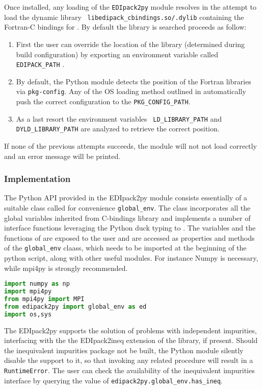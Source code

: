 \documentclass[edipack2.tex]{subfiles}
\begin{document}
Once installed, any loading of the {\tt EDIpack2py} module resolves in the
attempt to load the dynamic library {\tt
  libedipack\_cbindings.so/.dylib} containing the Fortran-C bindings
for \NAME. By default the library is searched proceeds as follow: 
\begin{enumerate}
\item First the user can override the location of the library
  (determined during \NAME build configuration) by exporting an
  environment variable called {\tt EDIPACK\_PATH} .
\item By default, the Python module detects the position of the
  Fortran libraries via {\tt pkg-config}. Any of the OS loading method
  outlined in  automatically push the
  correct configuration to the {\tt PKG\_CONFIG\_PATH}. 
\item As a last resort the environment variables {\tt
    LD\_LIBRARY\_PATH} and {\tt DYLD\_LIBRARY\_PATH} are analyzed to
  retrieve the correct position. 
\end{enumerate}
If none of the previous attempts succeeds, the module will not not load correctly and an error message will be printed. 



\subsubsection{Implementation}\label{sSecInteropEDIpyImplementation}
The Python API provided in the EDIpack2py module consists essentially of a
suitable class called for convenience {\tt global\_env}.
The class incorporates all the global variables inherited from \NAME
C-bindings library and implements a number of interface functions
leveraging the Python duck typing to \NAME.  
The variables and the functions of \NAME are exposed to the user and
are accessed as properties and
methods of the {\tt global\_env} claass, which needs to be imported at the beginning
of the python script, along with other useful modules. For instance Numpy is
necessary, while mpi4py is strongly recommended.

\begin{lstlisting}[language=python,  frame=lines]
import numpy as np
import mpi4py
from mpi4py import MPI
from edipack2py import global_env as ed
import os,sys
\end{lstlisting}

The EDIpack2py supports the solution of problems with independent
impurities, interfacing with the the EDIpack2ineq extension of the
library, if present. Should the inequivalent impurities package not be
built, the Python module silently disable the support to it, so that
invoking any related procedure  will result in a {\tt RuntimeError}.
The user can check the availability of the inequivalent impurities
interface by querying the value of  {\tt edipack2py.global\_env.has\_ineq}.
\end{document}
